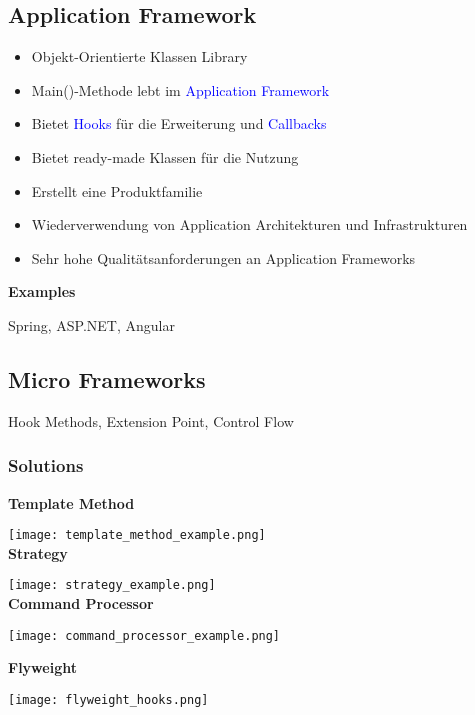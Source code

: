 \subsection{Application Framework}
\begin{itemize}
    \item Objekt-Orientierte Klassen Library
    \item Main()-Methode lebt im \textcolor{blue}{Application Framework}
    \item Bietet \textcolor{blue}{Hooks} für die Erweiterung und \textcolor{blue}{Callbacks}
    \item Bietet ready-made Klassen für die Nutzung
    \item Erstellt eine Produktfamilie
    \item Wiederverwendung von Application Architekturen und Infrastrukturen
    \item Sehr hohe Qualitätsanforderungen an Application Frameworks
\end{itemize}
\vspace{10pt}
\textbf{Examples}

Spring, ASP.NET, Angular

\subsection{Micro Frameworks}

Hook Methods, Extension Point, Control Flow

\subsubsection{Solutions}

\textbf{Template Method}

\texttt{[image: template\_method\_example.png]} \\

\textbf{Strategy}

\texttt{[image: strategy\_example.png]} \\

\textbf{Command Processor}

\texttt{[image: command\_processor\_example.png]} \\

\vfill\null
\columnbreak

\textbf{Flyweight}

\texttt{[image: flyweight\_hooks.png]}

